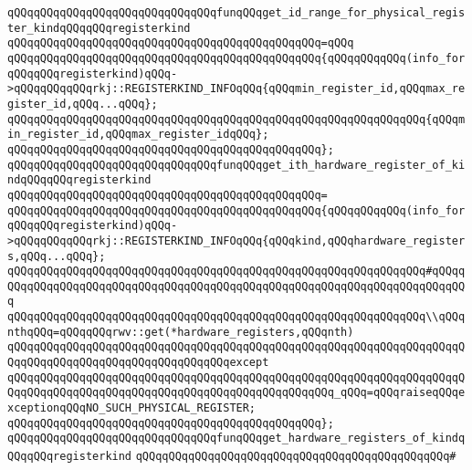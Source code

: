 \newline
\verb|qQQqqQQqqQQqqQQqqQQqqQQqqQQqqQQqfunqQQqget_id_range_for_physical_register_kindqQQqqQQqregisterkind|\newline
\verb|qQQqqQQqqQQqqQQqqQQqqQQqqQQqqQQqqQQqqQQqqQQqqQQq=qQQq|\newline
\verb|qQQqqQQqqQQqqQQqqQQqqQQqqQQqqQQqqQQqqQQqqQQqqQQq{qQQqqQQqqQQq(info_forqQQqqQQqregisterkind)qQQq->qQQqqQQqqQQqrkj::REGISTERKIND_INFOqQQq{qQQqmin_register_id,qQQqmax_register_id,qQQq...qQQq};|\newline
\newline
\verb|qQQqqQQqqQQqqQQqqQQqqQQqqQQqqQQqqQQqqQQqqQQqqQQqqQQqqQQqqQQqqQQq{qQQqmin_register_id,qQQqmax_register_idqQQq};|\newline
\verb|qQQqqQQqqQQqqQQqqQQqqQQqqQQqqQQqqQQqqQQqqQQqqQQq};|\newline
\newline
\verb|qQQqqQQqqQQqqQQqqQQqqQQqqQQqqQQqfunqQQqget_ith_hardware_register_of_kindqQQqqQQqregisterkind|\newline
\verb|qQQqqQQqqQQqqQQqqQQqqQQqqQQqqQQqqQQqqQQqqQQqqQQq=|\newline
\verb|qQQqqQQqqQQqqQQqqQQqqQQqqQQqqQQqqQQqqQQqqQQqqQQq{qQQqqQQqqQQq(info_forqQQqqQQqregisterkind)qQQq->qQQqqQQqqQQqrkj::REGISTERKIND_INFOqQQq{qQQqkind,qQQqhardware_registers,qQQq...qQQq};|\newline
\verb|qQQqqQQqqQQqqQQqqQQqqQQqqQQqqQQqqQQqqQQqqQQqqQQqqQQqqQQqqQQqqQQq#qQQqqQQqqQQqqQQqqQQqqQQqqQQqqQQqqQQqqQQqqQQqqQQqqQQqqQQqqQQqqQQqqQQqqQQqqQQq|\newline
\verb|qQQqqQQqqQQqqQQqqQQqqQQqqQQqqQQqqQQqqQQqqQQqqQQqqQQqqQQqqQQqqQQq\\qQQqnthqQQq=qQQqqQQqrwv::get(*hardware_registers,qQQqnth)|\newline
\verb|qQQqqQQqqQQqqQQqqQQqqQQqqQQqqQQqqQQqqQQqqQQqqQQqqQQqqQQqqQQqqQQqqQQqqQQqqQQqqQQqqQQqqQQqqQQqqQQqqQQqqQQqexcept|\newline
\verb|qQQqqQQqqQQqqQQqqQQqqQQqqQQqqQQqqQQqqQQqqQQqqQQqqQQqqQQqqQQqqQQqqQQqqQQqqQQqqQQqqQQqqQQqqQQqqQQqqQQqqQQqqQQqqQQqqQQqqQQq_qQQq=qQQqraiseqQQqexceptionqQQqNO_SUCH_PHYSICAL_REGISTER;|\newline
\verb|qQQqqQQqqQQqqQQqqQQqqQQqqQQqqQQqqQQqqQQqqQQqqQQq};|\newline
\newline
\verb|qQQqqQQqqQQqqQQqqQQqqQQqqQQqqQQqfunqQQqget_hardware_registers_of_kindqQQqqQQqregisterkind|\newline
\verb|qQQqqQQqqQQqqQQqqQQqqQQqqQQqqQQqqQQqqQQqqQQqqQQq#|\newline
